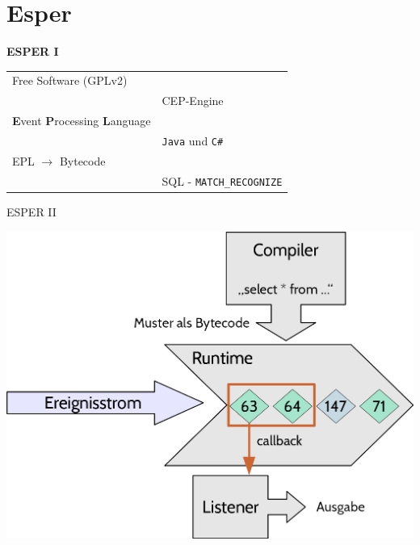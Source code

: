 \documentclass[usenames,dvipsnames]{beamer}
\begin{document}
\section{Esper}
\begin{frame}{}
\begin{center}
    \Large \textbf{ESPER I}
\end{center}

\vspace*{1cm}

\begin{tabular}{ll}
    Free Software (GPLv2) \hspace{3cm}   &\\
                            &CEP-Engine \\
    \hspace{2cm}\textbf{E}vent \textbf{P}rocessing \textbf{L}anguage & \\
                            &\hspace{2cm}\texttt{Java} und \texttt{C\#} \\ 
    \hspace{1cm}EPL $\rightarrow$ Bytecode&\\
        & SQL - \texttt{MATCH\_RECOGNIZE}\\
\end{tabular}
\end{frame}


\begin{frame}{ESPER II}
     \begin{center}
        \includegraphics[scale=0.3]{img/esper}\hspace*{1cm}
    \end{center} 
\end{frame}
\end{document}
